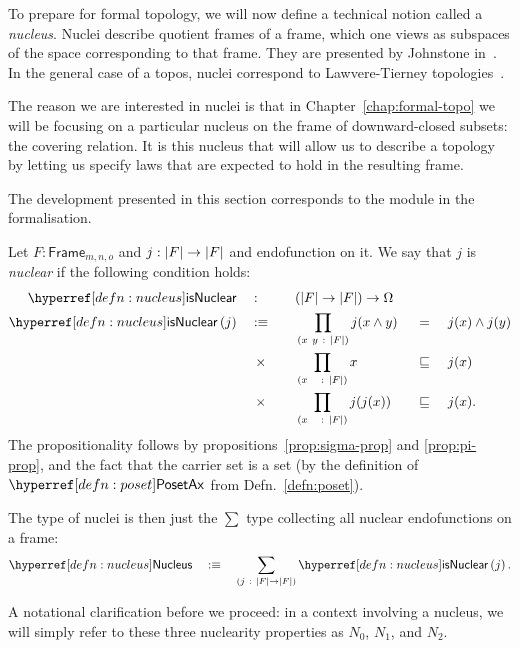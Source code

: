 To prepare for formal topology, we will now define a technical notion called a
\emph{nucleus}. Nuclei describe quotient frames of a frame, which one views as subspaces
of the space corresponding to that frame. They are presented by Johnstone
in~\cite[Sec.~II.2]{stone-spaces}. In the general case of a topos, nuclei correspond to
Lawvere-Tierney topologies~\cite{nlab-nucleus}.

The reason we are interested in nuclei is that in Chapter~\ref{chap:formal-topo} we will
be focusing on a particular nucleus on the frame of downward-closed subsets: the covering
relation. It is this nucleus that will allow us to describe a topology by letting us
specify laws that are expected to hold in the resulting frame.

The development presented in this section corresponds to the  module
in the \veragda{} formalisation.

\begin{defn}[Nucleus]\label{defn:nucleus}
  Let $F : \mathsf{Frame}_{m, n, o}$ and $j : \left| F \right| \rightarrow \left| F \right|$ and endofunction on it.
  We say that $j$ is \emph{nuclear} if the following condition holds:
  \begin{alignat*}{4}
    \isnuclearnm{}\quad&:\quad &&(\abs{F} \rightarrow \abs{F}) \rightarrow \Omega && &&              \\
    \isnuclear{j} \quad&\is\quad
       &&\pity{x~y}{\abs{F}}{j(\meet{x}{y}) &&~=~ &&\meet{j(x)}{j(y)}}  \\
      &\hspace{0.4em}\times\quad &&\pity{x~~}{\abs{F}}{x &&~\sqsubseteq~ &&j(x)}           \\
      &\hspace{0.4em}\times\quad &&\pity{x~~}{\abs{F}}{j(j(x)) &&~\sqsubseteq~ &&j(x)}.
  \end{alignat*}
  The propositionality follows by propositions~\ref{prop:sigma-prop} and
  \ref{prop:pi-prop}, and the fact that the carrier set is a set (by the definition of
  $\posetaxnm{}$ from Defn.~\ref{defn:poset}).

  The type of nuclei is then just the $\sum$ type collecting all nuclear endofunctions on a
  frame:
  \begin{equation*}
    \nucleus{} \quad\is\quad \sigmaty{j}{\abs{F} \rightarrow \abs{F}}{\isnuclear{j}}.
  \end{equation*}
\end{defn}

A notational clarification before we proceed: in a context involving a nucleus, we will
simply refer to these three nuclearity properties as $N_0$, $N_1$, and $N_2$.


